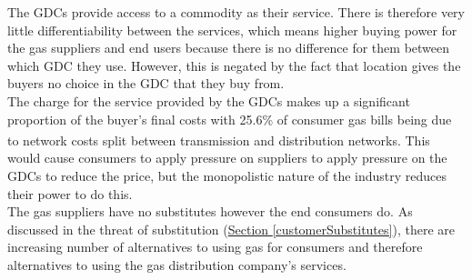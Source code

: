 \documentclass[11pt]{article}		%
\newcommand{\supercite}[1]{\textsuperscript{\cite{#1}}}		%
\newcommand{\sectref}[1]{\hyperref[#1]{Section \ref*{#1}}}     %
\begin{document}
                \hspace*{2ex}
                The GDCs provide access to a commodity as their service. There is therefore very little differentiability between the services, which means higher buying power for the gas suppliers and end users because there is no difference for them between which GDC they use. However, this is negated by the fact that location gives the buyers no choice in the GDC that they buy from.
              \\
                \hspace*{2ex}
                The charge for the service provided by the GDCs makes up a significant proportion of the buyer’s final costs with 25.6\% of consumer gas bills being due to network costs split between transmission and distribution networks\supercite{gas_cost}. %
                This would cause consumers to apply pressure on suppliers to apply pressure on the GDCs to reduce the price, but the monopolistic nature of the industry reduces their power to do this.
                \\
                \hspace*{2ex}
                The gas suppliers have no substitutes however the end consumers do. As discussed in the threat of substitution (\sectref{customerSubstitutes}), there are increasing number of alternatives to using gas for consumers and therefore alternatives to using the gas distribution company’s services. %
\end{document}
